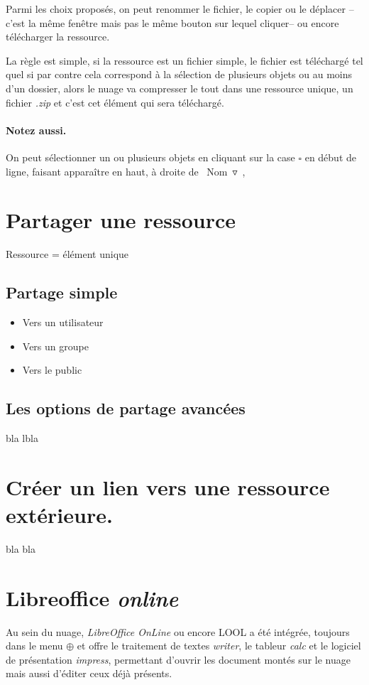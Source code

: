 Parmi les choix proposés, on peut renommer le fichier, le copier ou le déplacer --c'est la même fenêtre mais pas le même bouton sur lequel cliquer-- ou encore télécharger la ressource.

La règle est simple, si la ressource est un fichier simple, le fichier est téléchargé tel quel si par contre cela correspond à la sélection de plusieurs objets ou au moins d'un dossier, alors le nuage va compresser le tout dans une ressource unique, un fichier \emph{.zip} et c'est cet élément qui sera téléchargé.

\paragraph{Notez aussi.} 
On peut sélectionner un ou plusieurs objets en cliquant sur la case $\square$ en début de ligne, faisant apparaître en haut, à droite de \og~Nom~$\triangledown$~\fg{},

\section{Partager une ressource}

Ressource = élément unique

\subsection{Partage simple}

\begin{itemize}
    \item Vers un utilisateur
    \item Vers un groupe
    \item Vers le public 
\end{itemize}

\subsection{Les options de partage avancées}

bla lbla

\section{Créer un lien vers une ressource extérieure.}

bla bla

\section{Libreoffice \emph{online}}

Au sein du nuage, \emph{LibreOffice OnLine\/} ou encore LOOL a été intégrée, toujours dans le menu $\oplus$ et offre le traitement de textes \emph{writer\/}, le tableur \emph{calc\/} et le logiciel de présentation \emph{impress\/}, permettant d'ouvrir les document montés sur le nuage mais aussi d'éditer ceux déjà présents.

